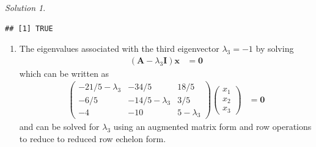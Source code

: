 \documentclass[
]{book}
\newenvironment{Shaded}{\begin{snugshade}}{\end{snugshade}}
\newcommand{\CommentTok}[1]{\textcolor[rgb]{0.56,0.35,0.01}{\textit{#1}}}
\newcommand{\DecValTok}[1]{\textcolor[rgb]{0.00,0.00,0.81}{#1}}
\newcommand{\KeywordTok}[1]{\textcolor[rgb]{0.13,0.29,0.53}{\textbf{#1}}}
\newcommand{\NormalTok}[1]{#1}
\newcommand{\OperatorTok}[1]{\textcolor[rgb]{0.81,0.36,0.00}{\textbf{#1}}}
\newcommand{\StringTok}[1]{\textcolor[rgb]{0.31,0.60,0.02}{#1}}
\providecommand{\tightlist}{%
  \setlength{\itemsep}{0pt}\setlength{\parskip}{0pt}}
\theoremstyle{definition}
\theoremstyle{definition}
\theoremstyle{definition}
\theoremstyle{definition}
\theoremstyle{remark}
\newtheorem*{solution}{Solution}
\begin{document}
\begin{solution}
\begin{Shaded}
\end{Shaded}

\begin{verbatim}
## [1] TRUE
\end{verbatim}

\begin{enumerate}
\def\labelenumi{\alph{enumi})}
\setcounter{enumi}{2}
\tightlist
\item
  The eigenvalues associated with the third eigenvector \(\lambda_3 = -1\) by solving
  \[
  \begin{aligned}
  \left( \mathbf{A} - \lambda_3 \mathbf{I} \right) \mathbf{x} & = \mathbf{0}
  \end{aligned}
  \]
  which can be written as
  \[
  \begin{aligned}
  \begin{pmatrix} 
  -21/5  - \lambda_3 & -34/5 & 18/5 \\
  -6/5 & -14/5 - \lambda_3 & 3/5 \\
  -4 & -10 & 5 - \lambda_3
  \end{pmatrix} \begin{pmatrix} x_1 \\ x_2 \\ x_3 \end{pmatrix} & = \mathbf{0}
  \end{aligned}
  \]
  and can be solved for \(\lambda_3\) using an augmented matrix form and row operations to reduce to reduced row echelon form.
\end{enumerate}


\end{solution}
\end{document}
